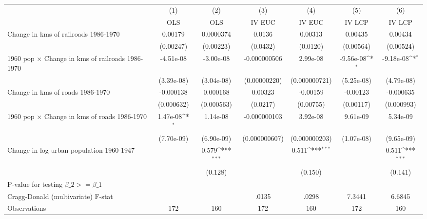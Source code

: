 {
\def\sym#1{\ifmmode^{#1}\else\(^{#1}\)\fi}
\begin{tabular}{l*{6}{c}}
\hline\hline
                &\multicolumn{1}{c}{(1)}&\multicolumn{1}{c}{(2)}&\multicolumn{1}{c}{(3)}&\multicolumn{1}{c}{(4)}&\multicolumn{1}{c}{(5)}&\multicolumn{1}{c}{(6)}\\
                &\multicolumn{1}{c}{OLS}&\multicolumn{1}{c}{OLS}&\multicolumn{1}{c}{IV EUC}&\multicolumn{1}{c}{IV EUC}&\multicolumn{1}{c}{IV LCP}&\multicolumn{1}{c}{IV LCP}\\
\hline
Change in kms of railroads 1986-1970&  0.00179         &0.0000374         &   0.0136         &  0.00313         &  0.00435         &  0.00434         \\
                &(0.00247)         &(0.00223)         & (0.0432)         & (0.0120)         &(0.00564)         &(0.00524)         \\
[1em]
1960 pop $\times$ Change in kms of railroads 1986-1970&-4.51e-08         &-3.00e-08         &-0.000000506         & 2.99e-08         &-9.56e-08\sym{*}  &-9.18e-08\sym{*}  \\
                &(3.39e-08)         &(3.04e-08)         &(0.00000220)         &(0.000000721)         &(5.25e-08)         &(4.79e-08)         \\
[1em]
Change in kms of roads 1986-1970&-0.000138         & 0.000168         &  0.00323         & -0.00159         & -0.00123         &-0.000635         \\
                &(0.000632)         &(0.000563)         & (0.0217)         &(0.00755)         &(0.00117)         &(0.000993)         \\
[1em]
1960 pop $\times$ Change in kms of roads 1986-1970& 1.47e-08\sym{*}  & 1.14e-08         &-0.000000103         & 3.92e-08         & 9.61e-09         & 5.34e-09         \\
                &(7.70e-09)         &(6.90e-09)         &(0.000000607)         &(0.000000203)         &(1.07e-08)         &(9.65e-09)         \\
[1em]
Change in log urban population 1960-1947&                  &    0.579\sym{***}&                  &    0.511\sym{***}&                  &    0.511\sym{***}\\
                &                  &  (0.128)         &                  &  (0.150)         &                  &  (0.141)         \\
\hline
P-value for testing $\beta\_{2} >= \beta\_{1}$&                  &                  &                  &                  &                  &                  \\
Cragg-Donald (multivariate) F-stat&                  &                  &    .0135         &    .0298         &   7.3441         &   6.6845         \\
Observations    &      172         &      160         &      172         &      160         &      172         &      160         \\
\hline\hline
\end{tabular}
}
